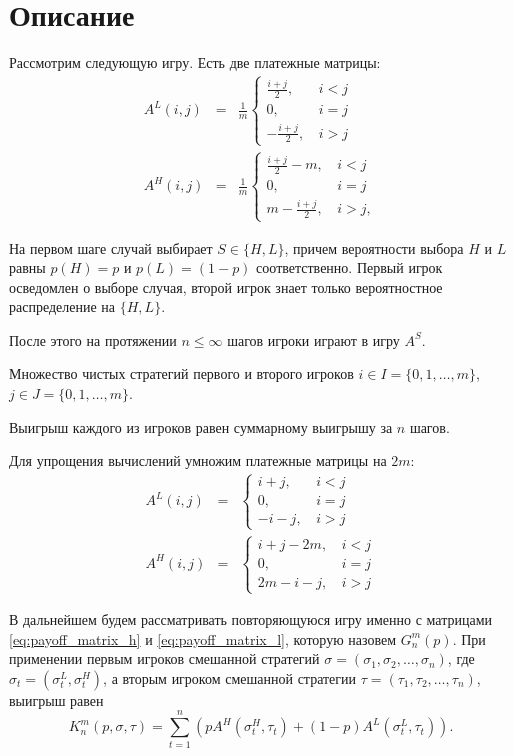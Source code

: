 \section{Описание}
Рассмотрим следующую игру.
Есть две платежные матрицы:
\begin{eqnarray*}
A^L(i, j) &=& \frac{1}{m}\begin{cases}
\frac{i+j}{2}, &\, i < j\\
0, &\, i = j\\
-\frac{i+j}{2}, &\, i > j
\end{cases}
\\
A^H(i, j) &=& \frac{1}{m}\begin{cases}
\frac{i+j}{2} - m, &\, i < j\\
0, &\, i = j\\
m - \frac{i+j}{2}, &\, i > j,
\end{cases}
\end{eqnarray*}

На первом шаге случай выбирает $ S \in \{H, L\} $, причем вероятности выбора $ H $ и $ L $ равны $ p(H) = p $ и $ p(L) = (1 - p) $ соответственно. Первый игрок осведомлен о выборе случая, второй игрок знает только вероятностное распределение на $ \{ H, L\} $.

После этого на протяжении $ n \leq \infty $ шагов игроки играют в игру $ A^S $.

Множество чистых стратегий первого и второго игроков 
$ i \in I = \{0, 1, \ldots, m\}$,
$ j \in J = \{0, 1, \ldots, m\} $.

Выигрыш каждого из игроков равен суммарному выигрышу за $ n $ шагов.


Для упрощения вычислений умножим платежные матрицы на $ 2m $:
\begin{eqnarray}
\label{eq:payoff_matrix_h}
A^L(i, j) &=& \begin{cases}
  i + j, &\, i < j\\
  0, &\, i = j\\
  -i - j, &\, i > j
\end{cases}
\\
\label{eq:payoff_matrix_l}
A^H(i, j) &=& \begin{cases}
  i + j - 2m, &\, i < j\\
  0, &\, i = j\\
  2m - i - j, &\, i > j
\end{cases}
\end{eqnarray}

В дальнейшем будем рассматривать повторяющуюся игру именно с матрицами \eqref{eq:payoff_matrix_h} и \eqref{eq:payoff_matrix_l}, которую назовем $ G_n^m(p) $. При применении первым игроков смешанной стратегий 
$ \sigma = (\sigma_1, \sigma_2, \ldots, \sigma_n) $, где 
$ \sigma_t = (\sigma_t^L, \sigma_t^H)$, 
а вторым игроком смешанной стратегии 
$ \tau = (\tau_1, \tau_2, \ldots, \tau_n) $, выигрыш равен
\begin{equation}
\label{eq:value_of_game_n}
K_n^m(p, \sigma, \tau) = \sum_{t=1}^n
    \left(
        pA^H(\sigma_t^H, \tau_t) + (1 - p)A^L(\sigma_t^L, \tau_t)
    \right).
\end{equation}
